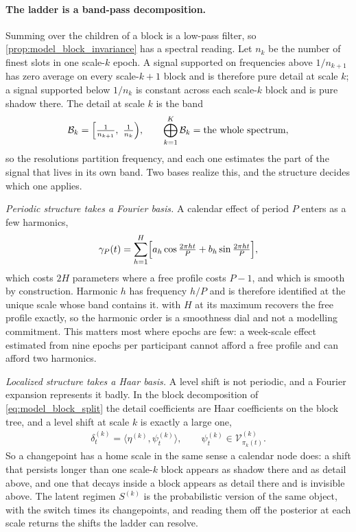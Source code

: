 \paragraph{The ladder is a band-pass decomposition.}
\label{sec:model_bands}

Summing over the children of a block is a low-pass filter, so
\cref{prop:model_block_invariance} has a spectral reading. Let \(n_k\) be the
number of finest slots in one scale-\(k\) epoch. A signal supported on
frequencies above \(1/n_{k+1}\) has zero average on every scale-\(k+1\) block
and is therefore pure detail at scale \(k\); a signal supported below
\(1/n_k\) is constant across each scale-\(k\) block and is pure shadow there.
The detail at scale \(k\) is the band
\begin{align}
 \mathcal B_k=\Bigl[\tfrac{1}{n_{k+1}},\ \tfrac{1}{n_k}\Bigr),
 \qquad
 \bigoplus_{k=1}^{K}\mathcal B_k=\text{the whole spectrum},
 \label{eq:model_bands}
\end{align}
so the resolutions partition frequency, and each one estimates the part of the
signal that lives in its own band. Two bases realize this, and the structure decides
which one applies.

\emph{Periodic structure takes a Fourier basis.} A calendar effect of period
\(P\) enters as a few harmonics,
\begin{align}
 \gamma_{P}(t)=\sum_{h=1}^{H}\Bigl[a_h\cos\tfrac{2\pi ht}{P}+b_h\sin\tfrac{2\pi ht}{P}\Bigr],
 \label{eq:model_harmonic}
\end{align}
which costs \(2H\) parameters where a free profile costs \(P-1\), and which is
smooth by construction. Harmonic \(h\) has frequency \(h/P\) and is therefore
identified at the unique scale whose band contains it. 
with \(H\) at its maximum recovers the free profile exactly, so the harmonic
order is a smoothness dial and not a modelling commitment. This matters most
where epochs are few: a week-scale effect estimated from nine epochs per
participant cannot afford a free profile and can afford two harmonics.

\emph{Localized structure takes a Haar basis.} A level shift is not periodic,
and a Fourier expansion represents it badly. In the block decomposition of
\cref{eq:model_block_split} the detail coefficients are Haar coefficients on
the block tree, and a level shift at scale \(k\) is exactly a large one,
\begin{align}
 \delta_t^{(k)}=\bigl\langle\eta^{(k)},\psi_t^{(k)}\bigr\rangle,
 \qquad
 \psi_t^{(k)}\in\mathcal V_{\pi_k(t)}^{(k)} .
 \label{eq:model_haar}
\end{align}
So a changepoint has a home scale in the same sense a calendar node does: a
shift that persists longer than one scale-\(k\) block appears as shadow there
and as detail above, and one that decays inside a block appears as detail
there and is invisible above. The latent regimen \(S^{(k)}\) is the
probabilistic version of the same object, with the switch times its
changepoints, and reading them off the posterior at each scale returns the
shifts the ladder can resolve.

